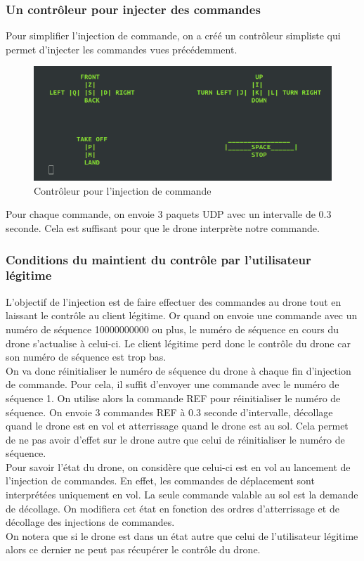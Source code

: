 \subsubsection{Un contrôleur pour injecter des commandes}
Pour simplifier l'injection de commande, on a créé un contrôleur simpliste qui permet d'injecter les commandes vues précédemment.

\begin{figure}[H]
  \centering
  \includegraphics[scale=0.6]{images/injection_command_controler.png}
  \caption{Contrôleur pour l'injection de commande}
\end{figure}

Pour chaque commande, on envoie 3 paquets UDP avec un intervalle de 0.3 seconde. Cela est suffisant pour que le drone interprète notre commande.

\subsubsection{Conditions du maintient du contrôle par l'utilisateur légitime}
L'objectif de l'injection est de faire effectuer des commandes au drone tout en laissant le contrôle au client légitime. Or quand on envoie une commande avec un numéro de séquence 10000000000 ou plus, le numéro de séquence en cours du drone s'actualise à celui-ci. Le client légitime perd donc le contrôle du drone car son numéro de séquence est trop bas.\\
On va donc réinitialiser le numéro de séquence du drone à chaque fin d'injection de commande. Pour cela, il suffit d'envoyer une commande avec le numéro de séquence 1. On utilise alors la commande REF pour réinitialiser le numéro de séquence. On envoie 3 commandes REF à 0.3 seconde d'intervalle, décollage quand le drone est en vol et atterrissage quand le drone est au sol. Cela permet de ne pas avoir d'effet sur le drone autre que celui de réinitialiser le numéro de séquence.\\
Pour savoir l'état du drone, on considère que celui-ci est en vol au lancement de l'injection de commandes. En effet, les commandes de déplacement sont interprétées uniquement en vol. La seule commande valable au sol est la demande de décollage. On modifiera cet état en fonction des ordres d’atterrissage et de décollage des injections de commandes.\\
On notera que si le drone est dans un état autre que celui de l'utilisateur légitime alors ce dernier ne peut pas récupérer le contrôle du drone.


